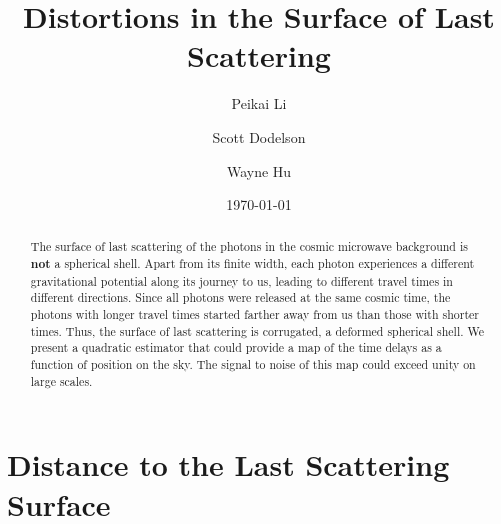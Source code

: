 \documentclass[prd,amsmath,amssymb,floatfix,superscriptaddress,nofootinbib,twocolumn]{revtex4-1}
\begin{document}
\title{Distortions in the Surface of Last Scattering}


\author{\large Peikai Li}
\author{\large Scott Dodelson}
\author{\large Wayne Hu}

\date{\today}

\begin{abstract}
The surface of last scattering of the photons in the cosmic microwave background is {\bf not} a spherical shell. Apart from its finite width, each photon experiences a different gravitational potential along its journey to us, leading to different travel times in different directions. Since all photons were released at the same cosmic time, the photons with longer travel times started farther away from us than those with shorter times. Thus, the surface of last scattering is corrugated, a deformed spherical shell. We present a quadratic estimator that could provide a map of the time delays as a function of position on the sky. The signal to noise of this map could exceed unity on large scales.
\end{abstract}

\maketitle

\section{Distance to the Last Scattering Surface}
\newcommand\fd{d}
\end{document}
